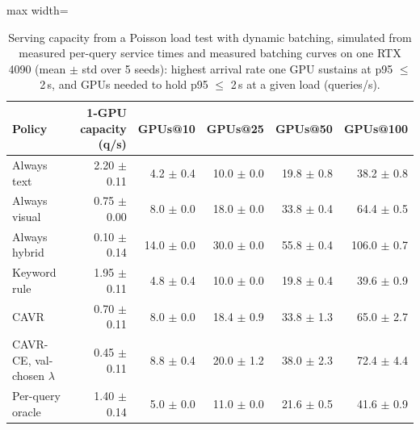 \begin{table}[t]
\centering
\caption{Serving capacity from a Poisson load test with dynamic batching, simulated from measured per-query service times and measured batching curves on one RTX 4090 (mean $\pm$ std over 5 seeds): highest arrival rate one GPU sustains at p95 $\leq$ 2\,s, and GPUs needed to hold p95 $\leq$ 2\,s at a given load (queries/s).}
\label{tab:load_test}
\begin{adjustbox}{max width=\linewidth}
\begin{tabular}{lrrrrr}
\toprule
\textbf{Policy} & \textbf{1-GPU capacity (q/s)} & \textbf{GPUs@10} & \textbf{GPUs@25} & \textbf{GPUs@50} & \textbf{GPUs@100} \\
\midrule
Always text & 2.20 $\pm$ 0.11 & 4.2 $\pm$ 0.4 & 10.0 $\pm$ 0.0 & 19.8 $\pm$ 0.8 & 38.2 $\pm$ 0.8 \\
Always visual & 0.75 $\pm$ 0.00 & 8.0 $\pm$ 0.0 & 18.0 $\pm$ 0.0 & 33.8 $\pm$ 0.4 & 64.4 $\pm$ 0.5 \\
Always hybrid & 0.10 $\pm$ 0.14 & 14.0 $\pm$ 0.0 & 30.0 $\pm$ 0.0 & 55.8 $\pm$ 0.4 & 106.0 $\pm$ 0.7 \\
Keyword rule & 1.95 $\pm$ 0.11 & 4.8 $\pm$ 0.4 & 10.0 $\pm$ 0.0 & 19.8 $\pm$ 0.4 & 39.6 $\pm$ 0.9 \\
CAVR & 0.70 $\pm$ 0.11 & 8.0 $\pm$ 0.0 & 18.4 $\pm$ 0.9 & 33.8 $\pm$ 1.3 & 65.0 $\pm$ 2.7 \\
CAVR-CE, val-chosen $\lambda$ & 0.45 $\pm$ 0.11 & 8.8 $\pm$ 0.4 & 20.0 $\pm$ 1.2 & 38.0 $\pm$ 2.3 & 72.4 $\pm$ 4.4 \\
Per-query oracle & 1.40 $\pm$ 0.14 & 5.0 $\pm$ 0.0 & 11.0 $\pm$ 0.0 & 21.6 $\pm$ 0.5 & 41.6 $\pm$ 0.9 \\
\bottomrule
\end{tabular}
\end{adjustbox}
\end{table}
